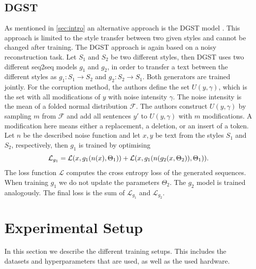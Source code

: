 \documentclass[twocolumn]{tum-article}
\begin{document}
\subsection{DGST}\label{sec:dgst}
As mentioned in \autoref{sec:intro} an alternative approach is the DGST model \cite{li2020dgst}. This approach is limited to the style transfer between two given styles and cannot be changed after training. The DGST approach is again based on a noisy reconstruction task. Let $S_1$ and $S_2$ be two different styles, then DGST uses two different seq2seq models $g_1$ and $g_2$, in order to transfer a text between the different styles as $g_1: S_1 \rightarrow S_2$ and $g_2: S_2 \rightarrow S_1$. Both generators are trained jointly. For the corruption method, the authors define the set $U(y, \gamma)$, which is the set with all modifications of $y$ with noise intensity $\gamma$. The noise intensity is the mean of a folded normal distribution $\mathcal{F}$. The authors construct $U(y, \gamma)$ by sampling $m$ from $\mathcal{F}$ and add all sentences $y'$ to $U(y, \gamma)$ with $m$ modifications. A modification here means either a replacement, a deletion, or an insert of a token. Let $n$ be the described noise function and let $x, y$ be text from the styles $S_1$ and $S_2$, respectively, then $g_1$ is trained by optimising 
$$
\mathcal{L}_{g_1} = \mathcal{L}(x, g_1(n(x), \Theta_1)) + \mathcal{L}(x, g_1(n(g_2(x, \Theta_2)), \Theta_1))\textnormal{.}
$$
The loss function $\mathcal{L}$ computes the cross entropy loss of the generated sequences. When training $g_1$ we do not update the parameters $\Theta_2$. The $g_2$ model is trained analogously. The final loss is the sum of $\mathcal{L}_{g_1}$ and $\mathcal{L}_{g_2}$.
\section{Experimental Setup}\label{sec:experiment_setup}
In this section we describe the different training setups. This includes the datasets and hyperparameters that are used, as well as the used hardware.
\end{document}
